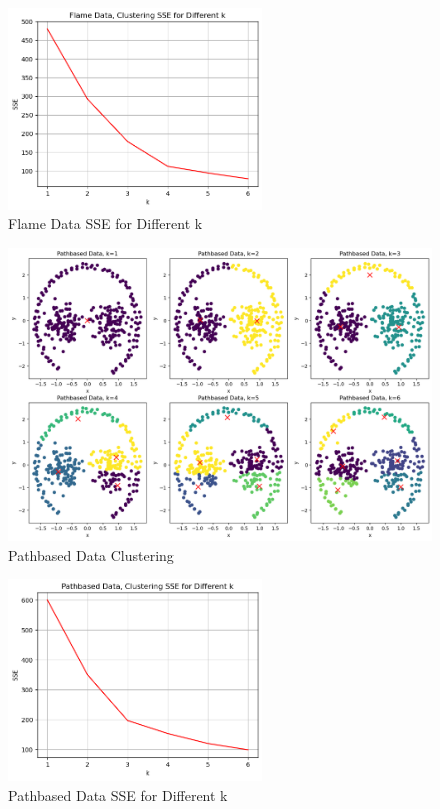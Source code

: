 \documentclass{article}
\begin{document}
\begin{figure}[H]
    \centering
    \includegraphics[width=0.6\textwidth]{flame_s.png}
    \caption{Flame Data SSE for Different k}
\end{figure}
\begin{figure}[H]
    \centering
    \includegraphics[width=\textwidth]{pathbased_p.png}
    \caption{Pathbased Data Clustering}
\end{figure}
\begin{figure}[H]
    \centering
    \includegraphics[width=0.6\textwidth]{pathbased_s.png}
    \caption{Pathbased Data SSE for Different k}
\end{figure}
\end{document}
